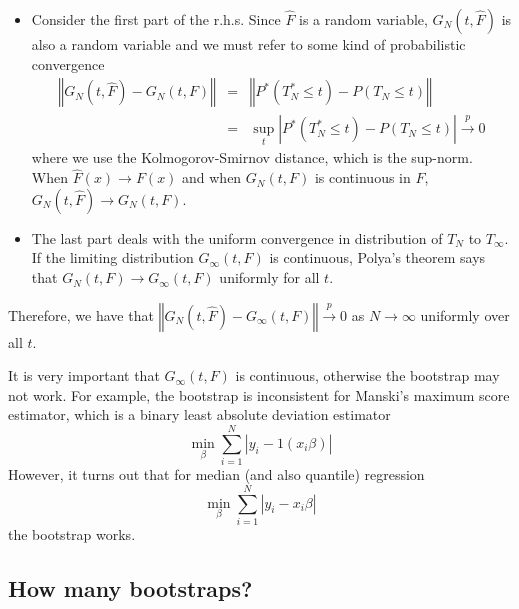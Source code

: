 \documentclass{article}
\begin{document}
\begin{itemize}
\item Consider the first part of the r.h.s. Since $\hat{F}$ is a random
variable, $G_{N}\left( t,\hat{F}\right) $ is also a random variable and we
must refer to some kind of probabilistic convergence%
\begin{eqnarray*}
\left \Vert G_{N}\left( t,\hat{F}\right) -G_{N}\left( t,F\right) \right
\Vert &=&\left \Vert P^{\ast }\left( T_{N}^{\ast }\leq t\right) -P\left(
T_{N}\leq t\right) \right \Vert \\
&=&\underset{t}{\sup }\left \vert P^{\ast }\left( T_{N}^{\ast }\leq t\right)
-P\left( T_{N}\leq t\right) \right \vert \overset{p}{\rightarrow }0
\end{eqnarray*}%
where we use the Kolmogorov-Smirnov distance, which is the sup-norm. When $%
\hat{F}\left( x\right) \rightarrow F\left( x\right) $ and when $G_{N}\left(
t,F\right) $ is continuous in $F$, $G_{N}\left( t,\hat{F}\right)
\longrightarrow G_{N}\left( t,F\right) $.

\item The last part deals with the uniform convergence in distribution of $%
T_{N}$ to $T_{\infty }$. If the limiting distribution $G_{\infty }\left(
t,F\right) $ is continuous, Polya's theorem says that $G_{N}\left(
t,F\right) \rightarrow G_{\infty }\left( t,F\right) $ uniformly for all $t$.
\end{itemize}

Therefore, we have that $\left \Vert G_{N}\left( t,\hat{F}\right) -G_{\infty
}\left( t,F\right) \right \Vert \overset{p}{\rightarrow }0$ as $N\rightarrow
\infty $ uniformly over all $t$.

It is very important that $G_{\infty }\left( t,F\right) $ is continuous,
otherwise the bootstrap may not work. For example, the bootstrap is
inconsistent for Manski's maximum score estimator, which is a binary least
absolute deviation estimator%
\begin{equation*}
\underset{\beta }{\min }\sum_{i=1}^{N}\left \vert y_{i}-1\left( x_{i}\beta
\right) \right \vert
\end{equation*}%
However, it turns out that for median (and also quantile) regression%
\begin{equation*}
\underset{\beta }{\min }\sum_{i=1}^{N}\left \vert y_{i}-x_{i}\beta \right
\vert
\end{equation*}%
the bootstrap works.

\subsection{How many bootstraps?}
\end{document}
